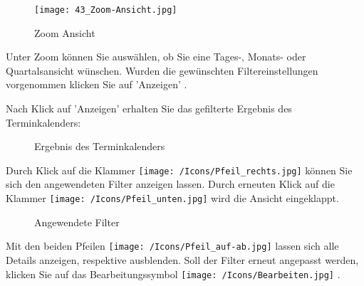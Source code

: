 
\vspace{\baselineskip}

\begin{figure}
  \vspace{-30pt}
  \begin{center}
    \texttt{[image: 43\_Zoom-Ansicht.jpg]}
  \end{center}
  \vspace{-20pt}
  \caption{Zoom Ansicht}
  \vspace{-10pt}
\end{figure}
Unter Zoom  können Sie auswählen, ob Sie eine Tages-, Monats- oder Quartalsansicht wünschen. Wurden die gewünschten Filtereinstellungen vorgenommen klicken Sie auf 'Anzeigen' .

\vspace{\baselineskip}
\vspace{\baselineskip}

Nach Klick auf 'Anzeigen' erhalten Sie das gefilterte Ergebnis des Terminkalenders:

\begin{figure}[H]
\caption{Ergebnis des Terminkalenders}
\end{figure}

Durch Klick auf die Klammer \texttt{[image: /Icons/Pfeil\_rechts.jpg]}  können Sie sich den angewendeten Filter anzeigen lassen. Durch erneuten Klick auf die Klammer \texttt{[image: /Icons/Pfeil\_unten.jpg]}  wird die Ansicht eingeklappt.

\begin{figure}[H]
\caption{Angewendete Filter}
\end{figure}

Mit den beiden Pfeilen \texttt{[image: /Icons/Pfeil\_auf-ab.jpg]}  lassen sich alle Details anzeigen, respektive ausblenden. Soll der Filter erneut angepasst werden, klicken Sie auf das Bearbeitungssymbol \texttt{[image: /Icons/Bearbeiten.jpg]} .

